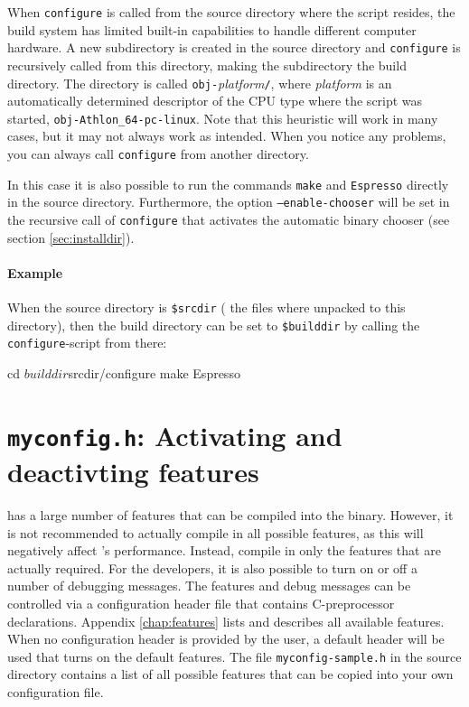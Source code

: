 When \texttt{configure} is called from the source directory where the
script resides, the \es build system has limited built-in capabilities
to handle different computer hardware.  A new subdirectory is created
in the source directory and \texttt{configure} is recursively called
from this directory, making the subdirectory the build directory.  The
directory is called \texttt{obj-}\textit{platform}\texttt{/}, where
\textit{platform} is an automatically determined descriptor of the CPU
type where the script was started, \eg
\mbox{\texttt{obj-Athlon\_64-pc-linux}}.  Note that this heuristic
will work in many cases, but it may not always work as intended.  When
you notice any problems, you can always call \texttt{configure} from
another directory.

In this case it is also possible to run the commands \texttt{make} and
\texttt{Espresso} directly in the source directory.  Furthermore, the
option \texttt{--enable-chooser} will be set in the recursive call of
\texttt{configure} that activates the automatic binary chooser (see
section \vref{sec:installdir}).

\paragraph{Example}
When the source directory is \texttt{\$srcdir} (\ie{} the files where
unpacked to this directory), then the build directory can be set to
\texttt{\$builddir} by calling the \texttt{configure}-script from
there:
\begin{code}
cd $builddir
$srcdir/configure
make
Espresso
\end{code}

\section{\texttt{myconfig.h}: Activating and deactivting features}
\label{sec:myconfig}

   \es
has a large number of features that can be compiled into the binary.
However, it is not recommended to actually compile in all possible
features, as this will negatively affect \es's performance.  Instead,
compile in only the features that are actually required.  For the
developers, it is also possible to turn on or off a number of
debugging messages.  The features and debug messages can be controlled
via a configuration header file that contains C-preprocessor
declarations. Appendix \vref{chap:features} lists and describes all
available features.  When no configuration header is provided by the
user, a default header will be used that turns on the default
features.  The file \texttt{myconfig-sample.h} in the source directory
contains a list of all possible features that can be copied into your
own configuration file.

